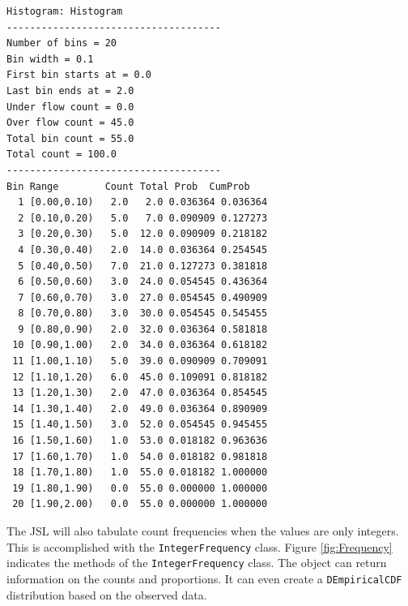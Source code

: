\documentclass[
]{book}
\theoremstyle{definition}
\theoremstyle{definition}
\theoremstyle{definition}
\theoremstyle{definition}
\theoremstyle{remark}
\begin{document}
\begin{verbatim}
Histogram: Histogram
-------------------------------------
Number of bins = 20
Bin width = 0.1
First bin starts at = 0.0
Last bin ends at = 2.0
Under flow count = 0.0
Over flow count = 45.0
Total bin count = 55.0
Total count = 100.0
-------------------------------------
Bin Range        Count Total Prob  CumProb
  1 [0.00,0.10)   2.0   2.0 0.036364 0.036364 
  2 [0.10,0.20)   5.0   7.0 0.090909 0.127273 
  3 [0.20,0.30)   5.0  12.0 0.090909 0.218182 
  4 [0.30,0.40)   2.0  14.0 0.036364 0.254545 
  5 [0.40,0.50)   7.0  21.0 0.127273 0.381818 
  6 [0.50,0.60)   3.0  24.0 0.054545 0.436364 
  7 [0.60,0.70)   3.0  27.0 0.054545 0.490909 
  8 [0.70,0.80)   3.0  30.0 0.054545 0.545455 
  9 [0.80,0.90)   2.0  32.0 0.036364 0.581818 
 10 [0.90,1.00)   2.0  34.0 0.036364 0.618182 
 11 [1.00,1.10)   5.0  39.0 0.090909 0.709091 
 12 [1.10,1.20)   6.0  45.0 0.109091 0.818182 
 13 [1.20,1.30)   2.0  47.0 0.036364 0.854545 
 14 [1.30,1.40)   2.0  49.0 0.036364 0.890909 
 15 [1.40,1.50)   3.0  52.0 0.054545 0.945455 
 16 [1.50,1.60)   1.0  53.0 0.018182 0.963636 
 17 [1.60,1.70)   1.0  54.0 0.018182 0.981818 
 18 [1.70,1.80)   1.0  55.0 0.018182 1.000000 
 19 [1.80,1.90)   0.0  55.0 0.000000 1.000000 
 20 [1.90,2.00)   0.0  55.0 0.000000 1.000000 
\end{verbatim}

The JSL will also tabulate count frequencies when the values are only integers. This is accomplished with the \texttt{IntegerFrequency} class. Figure \ref{fig:Frequency} indicates the methods of the \texttt{IntegerFrequency} class. The object can return information on the counts and proportions. It can even create a \texttt{DEmpiricalCDF} distribution based on the observed data.
\end{document}
